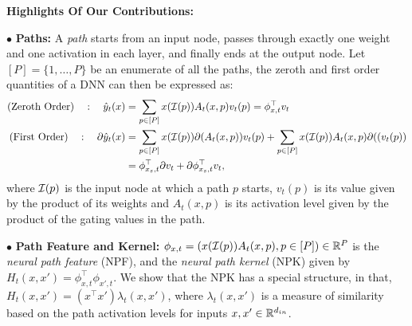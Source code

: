 \documentclass{article}
\begin{document}
\textbf{Highlights Of Our Contributions:}

$\bullet$ \textbf{Paths:}  A \emph{path} starts from an input node, passes through exactly one weight and one activation in each layer, and finally ends at the output node. Let $[P]=\{1,\ldots,P\}$ be an enumerate of all the paths, the zeroth and first order quantities of a DNN can then be expressed as:
\begin{align*}
\text{(Zeroth Order)}\quad: \quad \hat{y}_t(x)&=\sum_{p\in [P]}x(\mathcal{I}(p))A_t(x,p)v_t(p)={\phi^\top_{x,t}} v_t\\
\text{(First Order)}\quad: \quad \partial \hat{y}_t(x)&=\sum_{p\in [P]}x(\mathcal{I}(p)) \partial(A_t(x,p)) v_t(p)+ \sum_{p\in [P]}x(\mathcal{I}(p)) A_t(x,p) \partial((v_t(p))\\
&=\phi^\top_{x_s,t} {\partial} v_t + {\partial} \phi^\top_{x_s,t} v_t,
\end{align*}
where $\mathcal{I}(p)$ is the input node at which a path $p$ starts, $v_t(p)$ is its value given by the product of its weights and $A_t(x,p)$ is its activation level given by the product of the gating values in the path.

$\bullet$ \textbf{Path Feature and Kernel:}  $\phi_{x,t}=\left( x(\mathcal{I}(p))A_t(x,p),p\in[P]\right)\in \mathbb{R}^P$ is the \emph{neural path feature} (NPF), and the \emph{neural path kernel} (NPK) given by $H_t(x,x')=\phi^\top_{x,t}\phi_{x',t}$. We show that the NPK has a special structure, in that, $H_t(x,x')=(x^\top x')\lambda_t(x,x')$, where $\lambda_t(x,x')$ is a measure of similarity based on the path activation levels for inputs $x,x'\in\mathbb{R}^{d_{in}}$. %
\end{document}
